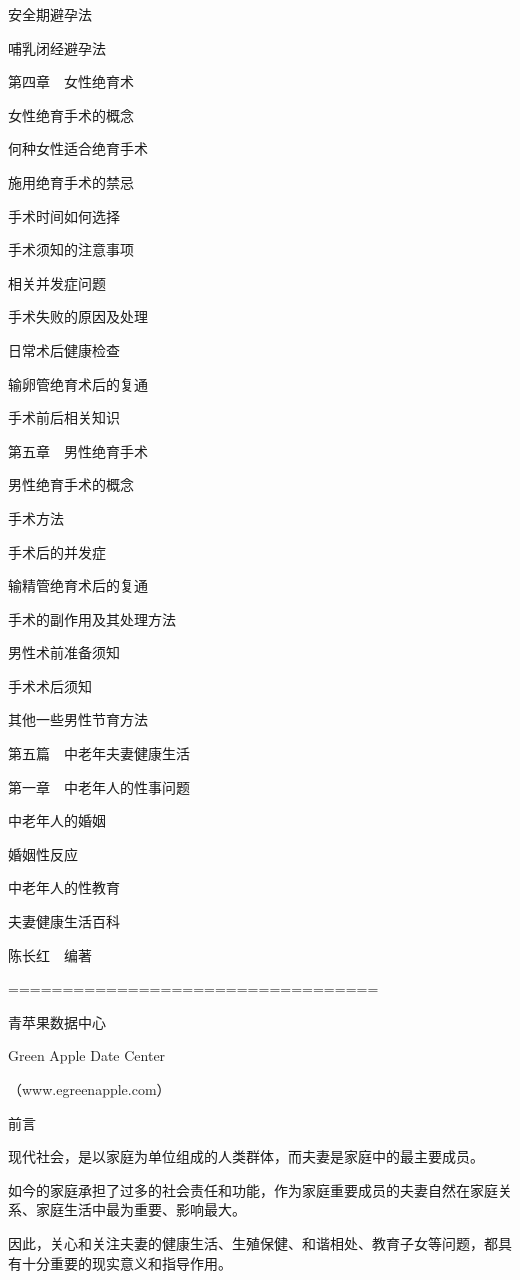 \documentclass[12pt,UTF8]{ctexbook}
\begin{document}
安全期避孕法

哺乳闭经避孕法

第四章　女性绝育术

女性绝育手术的概念

何种女性适合绝育手术

施用绝育手术的禁忌

手术时间如何选择

手术须知的注意事项

相关并发症问题

手术失败的原因及处理

日常术后健康检查

输卵管绝育术后的复通

手术前后相关知识

第五章　男性绝育手术

男性绝育手术的概念

手术方法

手术后的并发症

输精管绝育术后的复通

手术的副作用及其处理方法

男性术前准备须知

手术术后须知

其他一些男性节育方法

第五篇　中老年夫妻健康生活

第一章　中老年人的性事问题

中老年人的婚姻

婚姻性反应

中老年人的性教育





夫妻健康生活百科

陈长红　编著





==================================

青苹果数据中心

Green Apple Date Center

（www.egreenapple.com）





前言

现代社会，是以家庭为单位组成的人类群体，而夫妻是家庭中的最主要成员。

如今的家庭承担了过多的社会责任和功能，作为家庭重要成员的夫妻自然在家庭关系、家庭生活中最为重要、影响最大。

因此，关心和关注夫妻的健康生活、生殖保健、和谐相处、教育子女等问题，都具有十分重要的现实意义和指导作用。
\end{document}
